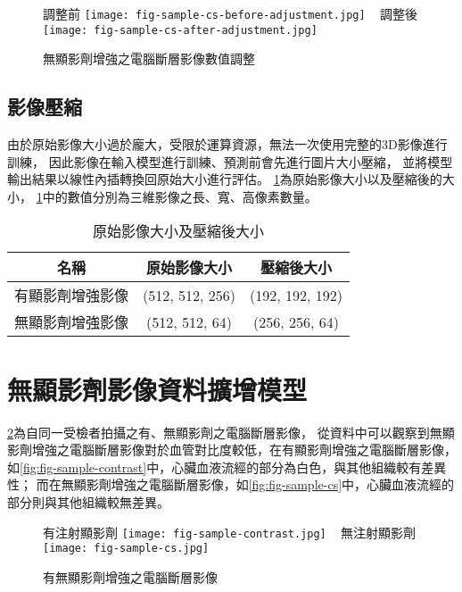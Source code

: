 \documentclass[class=NCU_thesis, crop=false]{standalone}
\begin{document}
\begin{figure}[!hbt]
    \centering
    \subcaptionbox
        {調整前
        \label{fig:fig-sample-cs-before-adjustment}}
        {\texttt{[image: fig-sample-cs-before-adjustment.jpg]}}
    ~
    \subcaptionbox
        {調整後
        \label{fig:fig-sample-cs-after-adjustment}}
        {\texttt{[image: fig-sample-cs-after-adjustment.jpg]}}
    \caption{無顯影劑增強之電腦斷層影像數值調整}
    \label{fig:fig-dataset-cs-before-after-adjustment}
\end{figure}

\subsection{影像壓縮}
由於原始影像大小過於龐大，受限於運算資源，無法一次使用完整的3D影像進行訓練，
因此影像在輸入模型進行訓練、預測前會先進行圖片大小壓縮，
並將模型輸出結果以線性內插轉換回原始大小進行評估。
\cref{table:table-image-size-compress}為原始影像大小以及壓縮後的大小，
\cref{table:table-image-size-compress}中的數值分別為三維影像之長、寬、高像素數量。
\begin{table}[h]
    \centering
    \caption{原始影像大小及壓縮後大小}
    \label{table:table-image-size-compress}
    \begin{tabular}{|c|c|c|}
    \hline
    名稱 & 原始影像大小 & 壓縮後大小 \\
    \hline
    有顯影劑增強影像 & (512, 512, 256) & (192, 192, 192) \\
    \hline
    無顯影劑增強影像 & (512, 512, 64) & (256, 256, 64) \\
    \hline
    \end{tabular}
\end{table}

\section{無顯影劑影像資料擴增模型}
\cref{fig:fig-sample-with-without-contrast}為自同一受檢者拍攝之有、無顯影劑之電腦斷層影像，
從資料中可以觀察到無顯影劑增強之電腦斷層影像對於血管對比度較低，在有顯影劑增強之電腦斷層影像，如\cref{fig:fig-sample-contrast}中，心臟血液流經的部分為白色，與其他組織較有差異性；
而在無顯影劑增強之電腦斷層影像，如\cref{fig:fig-sample-cs}中，心臟血液流經的部分則與其他組織較無差異。
\begin{figure}[!hbt]
    \centering
    \subcaptionbox
        {有注射顯影劑
        \label{fig:fig-sample-contrast}}
        {\texttt{[image: fig-sample-contrast.jpg]}}
    ~
    \subcaptionbox
        {無注射顯影劑
        \label{fig:fig-sample-cs}}
        {\texttt{[image: fig-sample-cs.jpg]}}
    \caption{有無顯影劑增強之電腦斷層影像}
    \label{fig:fig-sample-with-without-contrast}
\end{figure}
\end{document}
